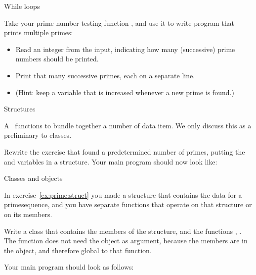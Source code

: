  {While loops}

\prerequisite{\ref{sec:loopuntil}}

\begin{exercise}
  \label{ex:prime:while}
  Take your prime number testing function , and use it to
  write program that prints multiple primes:
  \begin{itemize}
  \item Read an integer  from the input, indicating how
    many (successive) prime numbers should be printed.
  \item Print that many successive primes, each on a separate line.
  \item (Hint: keep a variable
     that is increased whenever a new prime is found.)
  \end{itemize}
\end{exercise}

 {Structures}

\prerequisite{\ref{sec:struct}, \ref{sec:reference}}

A~ functions to bundle together a number of data item. We
only discuss this as a preliminary to classes.

\begin{exercise}
  \label{ex:prime:struct}
  Rewrite the exercise that found a predetermined number of primes,
  putting the  and
   variables in a structure. Your main program should
  now look like:
\end{exercise}

 {Classes and objects}

\prerequisite{\ref{sec:object}, \ref{sec:objectf}}

In exercise~\ref{ex:prime:struct} you made a structure that contains
the data for a primesequence, and you have separate functions that
operate on that structure or on its members.

\begin{exercise}
  \label{ex:prime:sequence}
  Write a class  that contains the members of the
  structure, and the functions , . The
  function  does not need the object as argument,
  because the members are in the object, and therefore global
  to that function.

  Your main program should look as follows:
\end{exercise}

